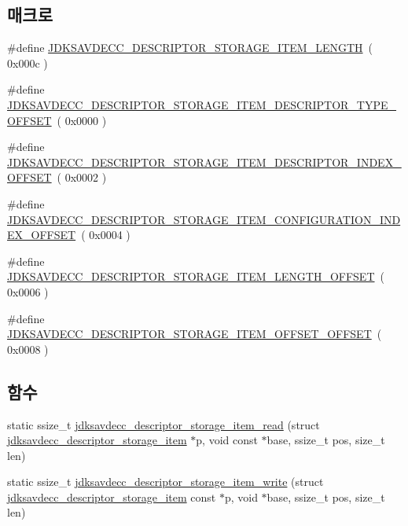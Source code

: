 \subsection*{매크로}
\begin{DoxyCompactItemize}
\item 
\#define \hyperlink{group__descriptor__storage__item_ga929fd9464abbbbf3d66fc15109d022b3}{J\+D\+K\+S\+A\+V\+D\+E\+C\+C\+\_\+\+D\+E\+S\+C\+R\+I\+P\+T\+O\+R\+\_\+\+S\+T\+O\+R\+A\+G\+E\+\_\+\+I\+T\+E\+M\+\_\+\+L\+E\+N\+G\+TH}~( 0x000c )
\item 
\#define \hyperlink{group__descriptor__storage__item_gae98a7643c1209f2ed405f156d01df21a}{J\+D\+K\+S\+A\+V\+D\+E\+C\+C\+\_\+\+D\+E\+S\+C\+R\+I\+P\+T\+O\+R\+\_\+\+S\+T\+O\+R\+A\+G\+E\+\_\+\+I\+T\+E\+M\+\_\+\+D\+E\+S\+C\+R\+I\+P\+T\+O\+R\+\_\+\+T\+Y\+P\+E\+\_\+\+O\+F\+F\+S\+ET}~( 0x0000 )
\item 
\#define \hyperlink{group__descriptor__storage__item_ga91a9b298385f93e5d97973b84a3c1c50}{J\+D\+K\+S\+A\+V\+D\+E\+C\+C\+\_\+\+D\+E\+S\+C\+R\+I\+P\+T\+O\+R\+\_\+\+S\+T\+O\+R\+A\+G\+E\+\_\+\+I\+T\+E\+M\+\_\+\+D\+E\+S\+C\+R\+I\+P\+T\+O\+R\+\_\+\+I\+N\+D\+E\+X\+\_\+\+O\+F\+F\+S\+ET}~( 0x0002 )
\item 
\#define \hyperlink{group__descriptor__storage__item_ga7206999291660720b4a417c04b96c57b}{J\+D\+K\+S\+A\+V\+D\+E\+C\+C\+\_\+\+D\+E\+S\+C\+R\+I\+P\+T\+O\+R\+\_\+\+S\+T\+O\+R\+A\+G\+E\+\_\+\+I\+T\+E\+M\+\_\+\+C\+O\+N\+F\+I\+G\+U\+R\+A\+T\+I\+O\+N\+\_\+\+I\+N\+D\+E\+X\+\_\+\+O\+F\+F\+S\+ET}~( 0x0004 )
\item 
\#define \hyperlink{group__descriptor__storage__item_ga0af0a97779ffef38b1266e5443eef4e5}{J\+D\+K\+S\+A\+V\+D\+E\+C\+C\+\_\+\+D\+E\+S\+C\+R\+I\+P\+T\+O\+R\+\_\+\+S\+T\+O\+R\+A\+G\+E\+\_\+\+I\+T\+E\+M\+\_\+\+L\+E\+N\+G\+T\+H\+\_\+\+O\+F\+F\+S\+ET}~( 0x0006 )
\item 
\#define \hyperlink{group__descriptor__storage__item_ga000aff4bba560ff201846087f2a3744c}{J\+D\+K\+S\+A\+V\+D\+E\+C\+C\+\_\+\+D\+E\+S\+C\+R\+I\+P\+T\+O\+R\+\_\+\+S\+T\+O\+R\+A\+G\+E\+\_\+\+I\+T\+E\+M\+\_\+\+O\+F\+F\+S\+E\+T\+\_\+\+O\+F\+F\+S\+ET}~( 0x0008 )
\end{DoxyCompactItemize}
\subsection*{함수}
\begin{DoxyCompactItemize}
\item 
static ssize\+\_\+t \hyperlink{group__descriptor__storage__item_gab105c3730864b355b06526c4ad53af7a}{jdksavdecc\+\_\+descriptor\+\_\+storage\+\_\+item\+\_\+read} (struct \hyperlink{structjdksavdecc__descriptor__storage__item}{jdksavdecc\+\_\+descriptor\+\_\+storage\+\_\+item} $\ast$p, void const $\ast$base, ssize\+\_\+t pos, size\+\_\+t len)
\item 
static ssize\+\_\+t \hyperlink{group__descriptor__storage__item_gabbb19e7d130d5da54877e56927078a7d}{jdksavdecc\+\_\+descriptor\+\_\+storage\+\_\+item\+\_\+write} (struct \hyperlink{structjdksavdecc__descriptor__storage__item}{jdksavdecc\+\_\+descriptor\+\_\+storage\+\_\+item} const $\ast$p, void $\ast$base, ssize\+\_\+t pos, size\+\_\+t len)
\end{DoxyCompactItemize}



